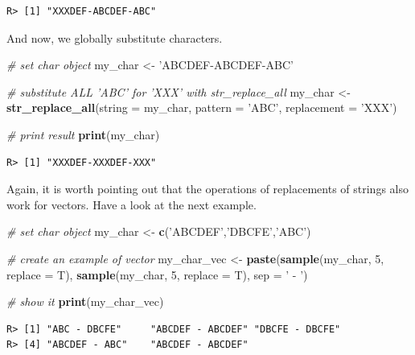 \documentclass[
  12pt,
]{book}
\newenvironment{Shaded}{\begin{snugshade}}{\end{snugshade}}
\newcommand{\CommentTok}[1]{\textcolor[rgb]{0.37,0.37,0.37}{\textit{#1}}}
\newcommand{\DataTypeTok}[1]{\textcolor[rgb]{0.27,0.27,0.27}{#1}}
\newcommand{\DecValTok}[1]{\textcolor[rgb]{0.06,0.06,0.06}{#1}}
\newcommand{\KeywordTok}[1]{\textcolor[rgb]{0.27,0.27,0.27}{\textbf{#1}}}
\newcommand{\NormalTok}[1]{#1}
\newcommand{\StringTok}[1]{\textcolor[rgb]{0.5,0.5,0.5}{#1}}
\begin{document}
\begin{verbatim}
R> [1] "XXXDEF-ABCDEF-ABC"
\end{verbatim}

And now, we globally substitute characters.

\begin{Shaded}
\begin{Highlighting}[]
\CommentTok{# set char object}
\NormalTok{my_char <-}\StringTok{ 'ABCDEF-ABCDEF-ABC'}

\CommentTok{# substitute ALL 'ABC' for 'XXX' with str_replace_all}
\NormalTok{my_char <-}\StringTok{ }\KeywordTok{str_replace_all}\NormalTok{(}\DataTypeTok{string =}\NormalTok{ my_char,}
                           \DataTypeTok{pattern =} \StringTok{'ABC'}\NormalTok{,}
                           \DataTypeTok{replacement =} \StringTok{'XXX'}\NormalTok{)}

\CommentTok{# print result}
\KeywordTok{print}\NormalTok{(my_char)}
\end{Highlighting}
\end{Shaded}

\begin{verbatim}
R> [1] "XXXDEF-XXXDEF-XXX"
\end{verbatim}

Again, it is worth pointing out that the operations of replacements of strings also work for vectors. Have a look at the next example.

\begin{Shaded}
\begin{Highlighting}[]
\CommentTok{# set char object}
\NormalTok{my_char <-}\StringTok{ }\KeywordTok{c}\NormalTok{(}\StringTok{'ABCDEF'}\NormalTok{,}\StringTok{'DBCFE'}\NormalTok{,}\StringTok{'ABC'}\NormalTok{)}

\CommentTok{# create an example of vector}
\NormalTok{my_char_vec <-}\StringTok{ }\KeywordTok{paste}\NormalTok{(}\KeywordTok{sample}\NormalTok{(my_char, }\DecValTok{5}\NormalTok{, }\DataTypeTok{replace =}\NormalTok{ T),}
                     \KeywordTok{sample}\NormalTok{(my_char, }\DecValTok{5}\NormalTok{, }\DataTypeTok{replace =}\NormalTok{ T),}
                     \DataTypeTok{sep =} \StringTok{' - '}\NormalTok{)}

\CommentTok{# show it}
\KeywordTok{print}\NormalTok{(my_char_vec)}
\end{Highlighting}
\end{Shaded}

\begin{verbatim}
R> [1] "ABC - DBCFE"     "ABCDEF - ABCDEF" "DBCFE - DBCFE"  
R> [4] "ABCDEF - ABC"    "ABCDEF - ABCDEF"
\end{verbatim}
\end{document}
